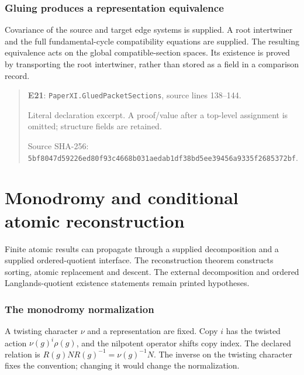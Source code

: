 \documentclass[10pt,oneside]{book}
\begin{document}

\subsection{Gluing produces a representation equivalence}
\label{guide:E21}
Covariance of the source and target edge systems is supplied. A root intertwiner and the full fundamental-cycle compatibility equations are supplied.
The resulting equivalence acts on the global compatible-section spaces. Its existence is proved by transporting the root intertwiner, rather than stored as a field in a comparison record.

\begin{quote}\footnotesize\textbf{E21}: \nolinkurl{PaperXI.GluedPacketSections}, source lines 138--144.\par Literal declaration excerpt. A proof/value after a top-level assignment is omitted; structure fields are retained.\par Source SHA-256: {\scriptsize\texttt{5bf8047d59226ed80f93c4668b031aedab1df38bd5ee39456a9335f2685372bf}}.\end{quote}


\chapter{Monodromy and conditional atomic reconstruction}
Finite atomic results can propagate through a supplied decomposition and a supplied ordered-quotient interface. The reconstruction theorem constructs sorting, atomic replacement and descent. The external decomposition and ordered Langlands-quotient existence statements remain printed hypotheses.

\subsection{The monodromy normalization}
\label{guide:E22}
A twisting character \(\nu\) and a representation are fixed. Copy \(i\) has the twisted action \(\nu(g)^i\rho(g)\), and the nilpotent operator shifts copy index.
The declared relation is \(R(g)NR(g)^{-1}=\nu(g)^{-1}N\). The inverse on the twisting character fixes the convention; changing it would change the normalization.
\end{document}
